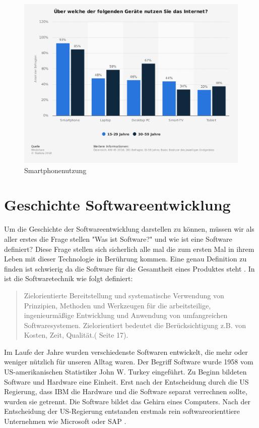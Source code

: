 \begin{figure}[h]
	\centering
	\includegraphics[width=12cm]{BilderAllgemein/SmartPhoneNutzung}\medskip
	\caption{Smartphonenutzung \cite{Geraetenutzung}}
	\label{fig:Smartphonenutzung}
\end{figure}

\section{Geschichte Softwareentwicklung}
Um die Geschichte der Softwareentwicklung darstellen zu können, müssen wir als aller erstes die Frage stellen "Was ist Software?" und wie ist eine Software definiert?
Diese Frage stellen sich sicherlich alle mal die zum ersten Mal in ihrem Leben mit dieser Technologie in Berührung kommen. Eine genau Definition zu finden ist schwierig da die Software für die Gesamtheit eines Produktes steht . In \cite{WasistSoftware} ist die Softwaretechnik wie folgt definiert:
\begin{quote}
\glqq Zielorientierte Bereitstellung und systematische Verwendung von Prinzipien, Methoden und Werkzeugen für
die arbeitsteilige, ingenieurmäßige Entwicklung und Anwendung
von umfangreichen Softwaresystemen. Zielorientiert bedeutet die
Berücksichtigung z.B. von Kosten, Zeit, Qualität.\grqq (\cite{WasistSoftware} Seite 17).
\end{quote}
Im Laufe der Jahre wurden verschiedenste Softwaren entwickelt, die mehr oder weniger nützlich für unseren Alltag waren.
Der Begriff Software wurde 1958 vom US-amerikanischen Statistiker John W. Turkey eingeführt.
Zu Beginn bildeten Software und Hardware eine Einheit. Erst nach der Entscheidung durch die US Regierung, dass IBM die Hardware und die Software separat verrechnen sollte, wurden sie getrennt.
Die Software bildet das Gehirn eines Computers. 
Nach der Entscheidung der US-Regierung entstanden erstmals rein softwareorienttiere Unternehmen wie Microsoft oder SAP \cite{Microsoft} \cite{SAP}. 


